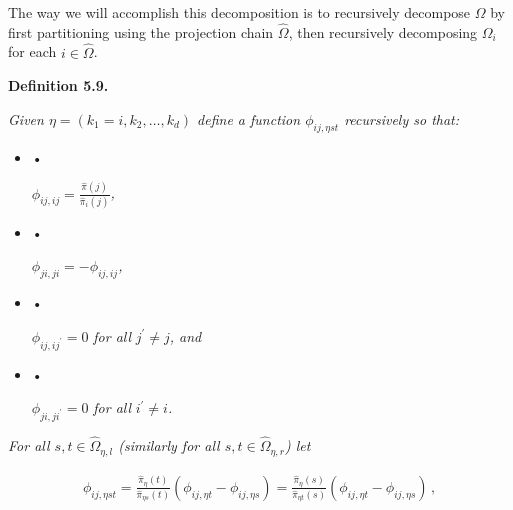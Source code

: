 The way we will accomplish this decomposition is to recursively decompose $\Omega$ by first partitioning using the projection chain $\hat{\Omega}$, then recursively decomposing $\Omega_{i}$ for each $i\in\hat{\Omega}$.\par





\par\medskip\noindent\textbf{\textbf{Definition 5.9}\textbf{.}}\par



\emph{Given $\eta=(k_{1}=i,k_{2},\dots,k_{d})$ define a function $\phi_{ij,\eta st}$ recursively so that:}\par


\begin{itemize}


\item[] • 


$\phi_{ij,ij}=\frac{\hat{\pi}(j)}{\hat{\pi}_{i}(j)}$\emph{\thinspace{},}\par




\item[] • 


$\phi_{ji,ji}=-\phi_{ij,ij}$\emph{\thinspace{},}\par




\item[] • 


$\phi_{ij,ij^{\prime}}=0$\emph{ for all }$j^{\prime}\neq j$\emph{, and}\par




\item[] • 


$\phi_{ji,ji^{\prime}}=0$\emph{ for all }$i^{\prime}\neq i$\emph{\thinspace{}.}\par




\end{itemize}




\emph{For all $s,t\in\hat{\Omega}_{\eta,l}$ (similarly for all $s,t\in\hat{\Omega}_{\eta,r}$) let}\par


\[\begin{gathered}
\displaystyle\phi_{ij,\eta st}=\frac{\hat{\pi}_{\eta}(t)}{\hat{\pi}_{\eta s}(t)}(\phi_{ij,\eta t}-\phi_{ij,\eta s})=\frac{\hat{\pi}_{\eta}(s)}{\hat{\pi}_{\eta t}(s)}(\phi_{ij,\eta t}-\phi_{ij,\eta s})\,,
\end{gathered}\]


